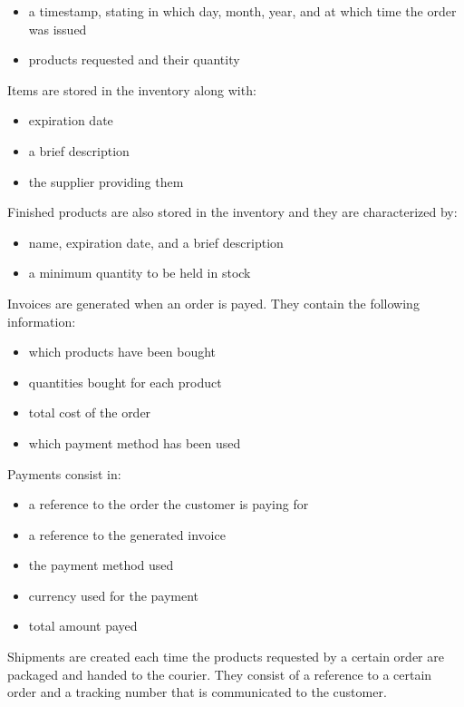 \begin{itemize}
	\item a timestamp, stating in which day, month, year, and at which time the order was issued
	\item products requested and their quantity
\end{itemize}
Items are stored in the inventory along with:
\begin{itemize}
	\item expiration date
	\item a brief description
	\item the supplier providing them
\end{itemize}
Finished products are also stored in the inventory and they are characterized by:
\begin{itemize}
	\item name, expiration date, and a brief description
	\item a minimum quantity to be held in stock
\end{itemize}
Invoices are generated when an order is payed. They contain the following information:
\begin{itemize}
	\item which products have been bought
	\item quantities bought for each product
	\item total cost of the order
	\item which payment method has been used
\end{itemize}
Payments consist in:
\begin{itemize}
	\item a reference to the order the customer is paying for
	\item a reference to the generated invoice
	\item the payment method used
	\item currency used for the payment
	\item total amount payed
\end{itemize}
Shipments are created each time the products requested by a certain order are packaged and handed to the courier. They consist of a reference to a certain order and a tracking number that is communicated to the customer.